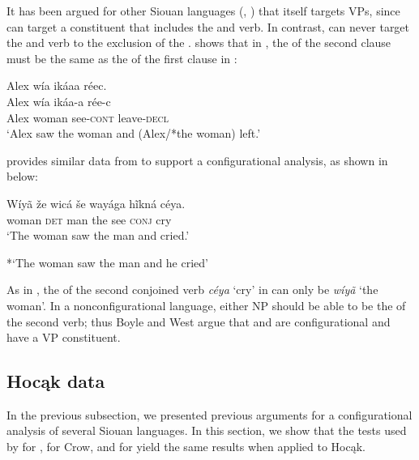 \documentclass[output=paper]{LSP/langsci}
\begin{document}
It has been argued for other Siouan languages (\citealt{Boyle2007}, \citealt{West2003}) that  itself targets VPs, since  can target a constituent that includes the  and verb. In contrast,  can never target the  and verb to the exclusion of the .  \citet{Boyle2007} shows that in , the  of the second clause must be the same as the  of the first clause in :

\begin{exe}
\ex\label{ex:jrs:29} 
\glll Alex wía ikáaa réec.\\
Alex wía ikáa-a rée-c \\
Alex woman see-\textsc{cont} leave-\textsc{decl} \\
\trans `Alex saw the woman and (Alex/*the woman) left.' \citep[217]{Boyle2007} 
\end{exe}

\citet{West2003} provides similar data from  to support a configurational analysis, as shown in  below:


\let\eachwordtwo=\upshape
\begin{exe}
\ex\label{ex:jrs:30} \gll Wíyã 	 \v{z}e 		{\ob}wicá 	\v{s}e 	wayága{\cb}  hĩkná 	{\ob}céya{\cb}. \\
woman 	\textsc{det} 	{\db}man 		the see 				\textsc{conj} 		{\db}cry \\
\trans `The woman saw the man and cried.'

*`The woman saw the man and he cried' \citep[34]{West2003}
\end{exe}

As in , the  of the second conjoined verb \textit{céya} `cry' in  can only be \textit{wíyã} `the woman'.  In a nonconfigurational language, either NP should be able to be the  of the second verb; thus Boyle and West argue that  and  are configurational and have a VP constituent.

 
\subsection{Hocąk data}

In the previous subsection, we presented previous arguments for a configurational analysis of several Siouan languages.  In this section, we show that the tests used by \citet{Boyle2007} for , \citet{Graczyk1991a} for Crow, and \citet{West2003} for  yield the same results when applied to Hocąk.
	
\end{document}
